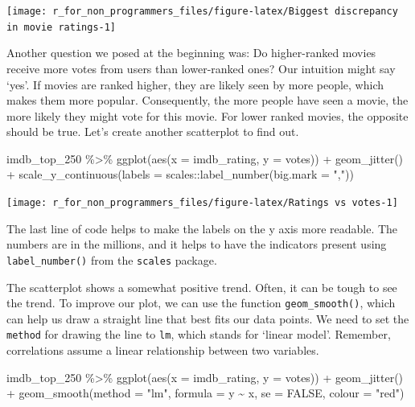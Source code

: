 \documentclass[
]{book}
\newenvironment{Shaded}{\begin{snugshade}}{\end{snugshade}}
\newcommand{\AttributeTok}[1]{\textcolor[rgb]{0.77,0.63,0.00}{#1}}
\newcommand{\ConstantTok}[1]{\textcolor[rgb]{0.00,0.00,0.00}{#1}}
\newcommand{\FunctionTok}[1]{\textcolor[rgb]{0.00,0.00,0.00}{#1}}
\newcommand{\NormalTok}[1]{#1}
\newcommand{\SpecialCharTok}[1]{\textcolor[rgb]{0.00,0.00,0.00}{#1}}
\newcommand{\StringTok}[1]{\textcolor[rgb]{0.31,0.60,0.02}{#1}}
\begin{document}
\begin{center}\texttt{[image: r\_for\_non\_programmers\_files/figure-latex/Biggest discrepancy in movie ratings-1]} \end{center}

Another question we posed at the beginning was: Do higher-ranked movies receive more votes from users than lower-ranked ones? Our intuition might say `yes'. If movies are ranked higher, they are likely seen by more people, which makes them more popular. Consequently, the more people have seen a movie, the more likely they might vote for this movie. For lower ranked movies, the opposite should be true. Let's create another scatterplot to find out.

\begin{Shaded}
\begin{Highlighting}[]
\NormalTok{imdb\_top\_250 }\SpecialCharTok{\%\textgreater{}\%}
  \FunctionTok{ggplot}\NormalTok{(}\FunctionTok{aes}\NormalTok{(}\AttributeTok{x =}\NormalTok{ imdb\_rating, }\AttributeTok{y =}\NormalTok{ votes)) }\SpecialCharTok{+} 
  \FunctionTok{geom\_jitter}\NormalTok{() }\SpecialCharTok{+}
  \FunctionTok{scale\_y\_continuous}\NormalTok{(}\AttributeTok{labels =}\NormalTok{ scales}\SpecialCharTok{::}\FunctionTok{label\_number}\NormalTok{(}\AttributeTok{big.mark =} \StringTok{","}\NormalTok{))}
\end{Highlighting}
\end{Shaded}

\begin{center}\texttt{[image: r\_for\_non\_programmers\_files/figure-latex/Ratings vs votes-1]} \end{center}

The last line of code helps to make the labels on the y axis more readable. The numbers are in the millions, and it helps to have the indicators present using \texttt{label\_number()} from the \texttt{scales} package.

The scatterplot shows a somewhat positive trend. Often, it can be tough to see the trend. To improve our plot, we can use the function \texttt{geom\_smooth()}, which can help us draw a straight line that best fits our data points. We need to set the \texttt{method} for drawing the line to \texttt{lm}, which stands for `linear model'. Remember, correlations assume a linear relationship between two variables.

\begin{Shaded}
\begin{Highlighting}[]
\NormalTok{imdb\_top\_250 }\SpecialCharTok{\%\textgreater{}\%}
  \FunctionTok{ggplot}\NormalTok{(}\FunctionTok{aes}\NormalTok{(}\AttributeTok{x =}\NormalTok{ imdb\_rating, }\AttributeTok{y =}\NormalTok{ votes)) }\SpecialCharTok{+} 
  \FunctionTok{geom\_jitter}\NormalTok{() }\SpecialCharTok{+}
  \FunctionTok{geom\_smooth}\NormalTok{(}\AttributeTok{method =} \StringTok{"lm"}\NormalTok{,}
              \AttributeTok{formula =}\NormalTok{ y }\SpecialCharTok{\textasciitilde{}}\NormalTok{ x,}
              \AttributeTok{se =} \ConstantTok{FALSE}\NormalTok{,}
              \AttributeTok{colour =} \StringTok{"red"}\NormalTok{)}
\end{Highlighting}
\end{Shaded}
\end{document}

